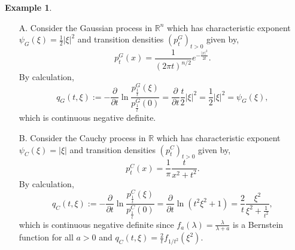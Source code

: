 \documentclass[a4paper, 12pt]{report}
\theoremstyle{cor}
\theoremstyle{remark}
\theoremstyle{definition}
\newtheorem{eg}[theorem]{Example}
\begin{document}
\begin{eg}\label{TDSME2}
\hspace{0.5cm}
\begin{itemize}
\item[A.] Consider the Gaussian process in $\mathbb{R}^n$ which has characteristic exponent $\psi_G(\xi) = \frac{1}{2}|\xi|^2$ and transition densities $(p_t^G)_{t > 0}$ given by,
$$
p_t^G(x) = \frac{1}{(2\pi t)^{n/2}}e^{-\frac{|x|^2}{2t}}.
$$
By calculation,
$$
q_G(t, \xi) := -\frac{\partial}{\partial t}\ln\frac{p_\frac{1}{t}^G(\xi)}{p_\frac{1}{t}^G(0)} = \frac{\partial}{\partial t}\frac{t}{2}|\xi|^2 = \frac{1}{2}|\xi|^2 = \psi_G(\xi),
$$
which is continuous negative definite.

\item[B.] Consider the Cauchy process in $\mathbb{R}$ which has characteristic exponent $\psi_C(\xi) = |\xi|$ and transition densities $(p_t^C)_{t > 0}$ given by,
$$
p_t^C(x) = \frac{1}{\pi}\frac{t}{x^2 + t^2}.
$$
By calculation,
$$
q_C(t, \xi) := -\frac{\partial}{\partial t}\ln\frac{p_\frac{1}{t}^C(\xi)}{p_\frac{1}{t}^C(0)} = \frac{\partial}{\partial t}\ln(t^2\xi^2 + 1) = \frac{2}{t}\frac{\xi^2}{\xi^2 + \frac{1}{t^2}},
$$
which is continuous negative definite since $f_a(\lambda) = \frac{\lambda}{\lambda + a}$ is a Bernstein function for all $a > 0$ and $q_C(t, \xi) = \frac{2}{t}f_{1/t^2}(\xi^2)$.


\end{itemize}
\end{eg}
\end{document}
